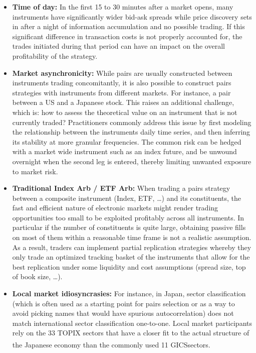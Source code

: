 \begin{itemize}
\item \textbf{Time of day:} In the first 15 to 30 minutes after a market opens, many instruments have significantly wider bid-ask spreads while price discovery sets in after a night of information accumulation and no possible trading. If this significant difference in transaction costs is not properly accounted for, the trades initiated during that period can have an impact on the overall profitability of the strategy.

\item \textbf{Market asynchronicity:} While pairs are usually constructed between instruments trading concomitantly, it is also possible to construct pairs strategies with instruments from different markets. For instance, a pair between a US and a Japanese stock. This raises an additional challenge, which is: how to assess the theoretical value on an instrument that is not currently traded? Practitioners commonly address this issue by first modeling the relationship between the instruments daily time series, and then inferring its stability at more granular frequencies. The common risk can be hedged with a market wide instrument such as an index future, and be unwound overnight when the second leg is entered, thereby limiting unwanted exposure to market risk.

\item \textbf{Traditional Index Arb / ETF Arb:} When trading a pairs strategy between a composite instrument (Index, ETF, \dots) and its constituents, the fast and efficient nature of electronic markets might render trading opportunities too small to be exploited profitably across all instruments. In particular if the number of constituents is quite large, obtaining passive fills on most of them within a reasonable time frame is not a realistic assumption. As a result, traders can implement partial replication strategies whereby they only trade an optimized tracking basket of the instruments that allow for the best replication under some liquidity and cost assumptions (spread size, top of book size, \dots). 

\item \textbf{Local market idiosyncrasies:} For instance, in Japan, sector classification (which is often used as a starting point for pairs selection or as a way to avoid picking names that would have spurious autocorrelation) does not match international sector classification one-to-one. Local market participants rely on the 33 TOPIX sectors that have a closer fit to the actual structure of the Japanese economy than the commonly used 11 GICS\textsuperscript\textregistered sectors.


\end{itemize}
